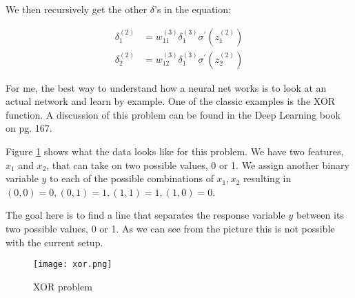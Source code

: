  We then recursively get the other $\delta$'s in the equation:
 
 \begin{equation}
 \begin{split}
 \delta^{(2)}_1  & = w_{11}^{(3)}\delta_1^{(3)}\sigma^{\prime}(z_1^{(2)})\\
 \delta^{(2)}_2  & = w_{12}^{(3)}\delta_1^{(3)}\sigma^{\prime}(z_2^{(2)})
 \end{split}
 \end{equation}
 

 
 
 For me, the best way to understand how a neural net works is to look at an actual network and learn by example. One of the classic examples is the XOR function. A discussion of this problem can be found in the Deep Learning book on pg. 167.

Figure \ref{fig:xor} shows what the data looks like for this problem. We have two features, $x_1$ and $x_2$, that can take on two possible values, 0 or 1. We assign another binary variable $y$ to each of the possible combinations of $x_1, x_2$ resulting in $(0,0) = 0, (0,1)=1, (1,1)=1, (1,0)=0$.

The goal here is to find a line that separates the response variable $y$ between its two possible values, 0 or 1. As we can see from the picture this is not possible with the current setup.

 \begin{figure} \label{fig:xor}
\caption{XOR problem}
\centering
 \texttt{[image: xor.png]}
 \end{figure}
 